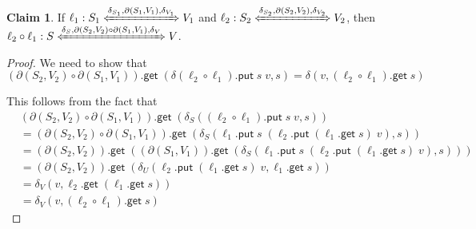 \documentclass[acmsmall,review,anonymous]{acmart}\settopmatter{printfolios=true,printccs=false,printacmref=false}
\theoremstyle{definition}
\newtheorem{claim}{Claim}
\newcommand{\kw}[1]{\ensuremath{\mathsf{#1}}\xspace}
\newcommand{\get}{\ensuremath{\kw{get}}\xspace}
\newcommand{\pput}{\ensuremath{\kw{put}}\xspace}
\begin{document}
\begin{claim}
If $\ell_1 : S_1  \xLeftrightarrow{\delta_{S_1}, \partial (S_1, V_1),
\delta_{V_1}} V_1$ and $\ell_2 : S_2 \xLeftrightarrow{\delta_{S_2}, \partial
(S_2, V_2), \delta_{V_2}} V_2$, then \\
$\ell_2 \circ \ell_1 :  S \xLeftrightarrow{\delta_S, \partial
(S_2, V_2) \circ \partial (S_1, V_1), \delta_V} V$.
\end{claim}
\begin{proof}
We need to show that
$$
(\partial (S_2, V_2) \circ \partial (S_1, V_1)).\get \; (\delta(\ell_2 \circ
\ell_1).\pput \; s \; v, s) = \delta(v, (\ell_2 \circ \ell_1).\get \; s)$$

This follows from the fact that
\begin{align*}
&(\partial (S_2, V_2) \circ \partial (S_1, V_1)).\get \; (\delta_S((\ell_2 \circ
\ell_1).\pput \; s \; v, s))\\
&=(\partial (S_2, V_2) \circ \partial (S_1, V_1)).\get \; (\delta_S(\ell_1.\pput
\; s \; (\ell_2.\pput \; (\ell_1.\get \; s) \; v), s))\\
&= (\partial (S_2, V_2)).\get \; ((\partial (S_1, V_1)).\get \;
(\delta_S(\ell_1.\pput \; s \; (\ell_2.\pput \; (\ell_1.\get \; s) \; v), s)))\\
&= (\partial (S_2, V_2)).\get \; (\delta_U(\ell_2.\pput \; (\ell_1.\get \; s)
\; v, \ell_1.\get \; s))\\
&= \delta_V(v, \ell_2.\get \; (\ell_1.\get \; s))\\
&= \delta_V(v, (\ell_2 \circ \ell_1).\get \; s)
\end{align*}
\end{proof}
\iffalse
\end{document}
